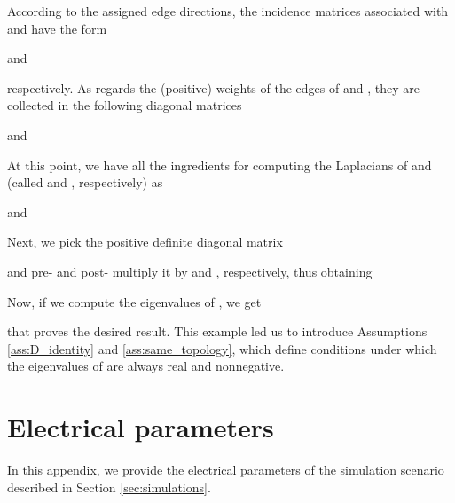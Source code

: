\documentclass[a4paper]{article}
\theoremstyle{plain}
\begin{document}
According to the assigned edge directions, the incidence matrices associated with  and  have the form

and

respectively. As regards the (positive) weights of the edges of  and , they are collected in the following diagonal matrices

and
\small

\normalsize
At this point, we have all the ingredients for computing the Laplacians of  and  (called  and , respectively) as

and

Next, we pick the positive definite diagonal matrix 

and pre- and post- multiply it by  and , respectively, thus obtaining

Now, if we compute the eigenvalues of , we get 

that proves the desired result. This example led us to introduce Assumptions \ref{ass:D_identity} and \ref{ass:same_topology}, which define conditions under which the eigenvalues of  are always real and nonnegative. 	\newpage
     \section{Electrical parameters }
 \label{sec:AppElectrPar}
 In this appendix, we provide the electrical parameters of the simulation scenario described in Section \ref{sec:simulations}.
 
\end{document}
